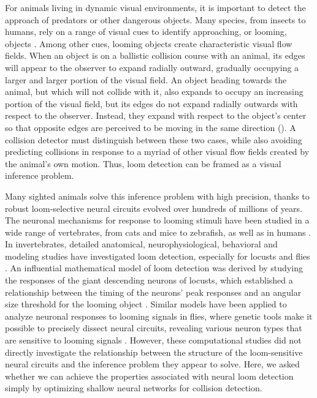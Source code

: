 \documentclass[pdftex,9pt,lineno]{elife}
\begin{document}
For animals living in dynamic visual environments, it is important to detect the approach of predators or other dangerous objects. Many species, from insects to humans, rely on a range of visual cues to identify approaching, or looming, objects \citep{regan1978looming,sun1998computation,gabbiani1999computation,card2008visually,munch2009approach,temizer2015visual}. Among other cues, looming objects create characteristic visual flow fields. When an object is on a ballistic collision course with an animal, its edges will appear to the observer to expand radially outward, gradually occupying a larger and larger portion of the visual field. An object heading towards the animal, but which will not collide with it, also expands to occupy an increasing portion of the visual field, but its edges do not expand radially outwards with respect to the observer. Instead, they expand with respect to the object's center so that opposite edges are perceived to be moving in the same direction (). A collision detector must distinguish between these two cases, while also avoiding predicting collisions in response to a myriad of other visual flow fields created by the animal's own motion. Thus, loom detection can be framed as a visual inference problem.

Many sighted animals solve this inference problem with high precision, thanks to robust loom-selective neural circuits evolved over hundreds of millions of years. The neuronal mechanisms for response to looming stimuli have been studied in a wide range of vertebrates, from cats and mice to zebrafish, as well as in humans
\citep{king1992use,hervais2015looming,ball1971infant,liu2011neuronal,salay2018midline,liu2011neuronal,shang2015parvalbumin,wu2005tectal,temizer2015visual,dunn2016neural,bhattacharyya2017visual}.
In invertebrates, detailed anatomical, neurophysiological, behavioral and modeling studies have investigated loom detection, especially for locusts and flies \citep{oliva2014computation,sato2014role,santer2005gliding,rind1996neural,card2008visually,de2012loom,muijres2014flies,klapoetke2017ultra,von2017feature,ache2019neural}.
An influential mathematical model of loom detection was derived by studying the responses of the giant descending neurons of locusts, which established a relationship between the timing of the neurons' peak responses and an angular size threshold for the looming object \citep{gabbiani1999computation}. Similar models have been applied to analyze neuronal responses to looming signals in flies, where genetic tools make it possible to precisely dissect neural circuits, revealing various neuron types that are sensitive to looming signals \citep{von2017feature,ache2019neural,morimoto2020spatial}.  However, these computational studies did not directly investigate the relationship between the structure of the loom-sensitive neural circuits and the inference problem they appear to solve. Here, we asked whether we can achieve the properties associated with neural loom detection simply by optimizing shallow neural networks for collision detection.
\end{document}

